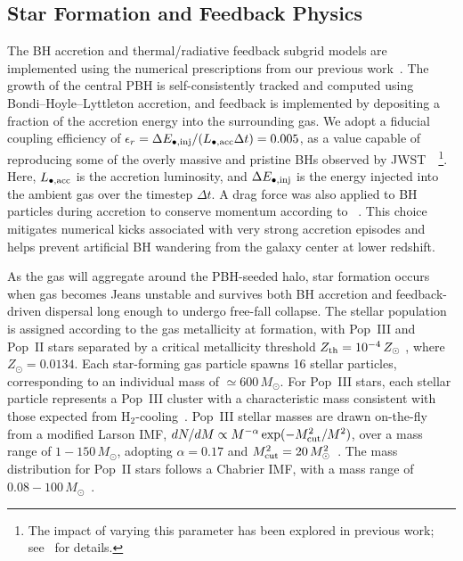 \documentclass[twocolumn,trackchanges]{aastex701}
\begin{document}
\subsection{Star Formation and Feedback Physics\label{subsec:sim}}

The BH accretion and thermal/radiative feedback subgrid models are implemented using the numerical prescriptions from our previous work~\citep{ZhangPBHGalaxy2025ApJ, Zhang2026PBHApJL}. The growth of the central PBH is self-consistently tracked and computed using Bondi--Hoyle--Lyttleton accretion, and feedback is implemented by depositing a fraction of the accretion energy into the surrounding gas. We adopt a fiducial coupling efficiency of $\epsilon_r = \Delta E_{\bullet, \rm inj} / (L_{\bullet, \rm acc} \Delta t) = 0.005$, as a value capable of reproducing some of the overly massive and pristine BHs observed by JWST~\citep{Zhang2026PBHApJL}~\footnote{The impact of varying this parameter has been explored in previous work; see~\citet{ZhangPBHGalaxy2025ApJ,Zhang2026PBHApJL} for details.}. Here, $L_{\bullet,\rm acc}$ is the accretion luminosity, and $\Delta E_{\bullet,\rm inj}$ is the energy injected into the ambient gas over the timestep $\Delta t$. %
A drag force was also applied to BH particles during accretion to conserve momentum according to ~\cite{springel2005modelling}. This choice mitigates numerical kicks associated with very strong accretion episodes and helps prevent artificial BH wandering from the galaxy center at lower redshift.

As the gas will aggregate around the PBH-seeded halo, star formation occurs when gas becomes Jeans unstable and survives both BH accretion and feedback-driven dispersal long enough to undergo free-fall collapse. The stellar population is assigned according to the gas metallicity at formation, with Pop~III and Pop~II stars separated by a critical metallicity threshold $Z_{\rm th}=10^{-4}\,Z_\odot$ \citep[e.g.,][]{BFCL2001}, where $Z_\odot=0.0134$. 
Each star-forming gas particle spawns 16 stellar particles, corresponding to an individual mass of $\simeq600\,M_\odot$.  For Pop~III stars, each stellar particle represents a Pop~III cluster with a characteristic mass consistent with those expected from H$_2$-cooling~\citep[e.g.,][]{Stacy2013PopIII,Hirano2017MNRAS.470..898H,Liu2021, Liu2024_Mass,Gurian2026}. Pop~III stellar masses are drawn on-the-fly from a modified Larson IMF, $dN / dM \propto M^{-\alpha} \exp(-M_{\rm cut}^2 / M^2)$, over a mass range of $1-150 \,M_{\odot}$, adopting $\alpha = 0.17$ and $M_{\rm cut}^2 = 20 \,M_{\odot}^2 $~\citep{Jaacks2018}. The mass distribution for Pop~II stars follows a Chabrier IMF, with a mass range of $0.08 - 100\,M_{\odot}$~\citep{Jaacks2019}. 
\end{document}
